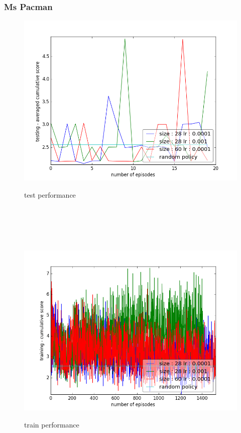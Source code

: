 \documentclass{report}
\begin{document}
\subsubsection*{Ms Pacman}


\begin{figure}[H]
\begin{minipage}[c]{.49\linewidth}
	\centering
	\includegraphics[width = \linewidth]{plots/b3/MsPacman-v3/testScoreMean.png}
	\caption{test performance}
    \end{minipage}
    \hfill%
\begin{minipage}[c]{.49\linewidth}
    \centering 
    \includegraphics[width = \linewidth]{plots/b3/MsPacman-v3/trainScore.png}
	\caption{train performance}
\end{minipage}
\end{figure}
\end{document}
